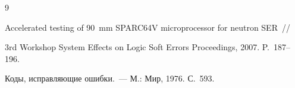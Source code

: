 {{\begin{thebibliography}{9}




Accelerated testing of 90~mm SPARC64V microprocessor for neutron SER~/\!\!/ 


 3rd Workshop System Effects on Logic Soft Errors Proceedings, 2007. P.~187--196.


 


 \label{end\stat}









Коды, исправляющие ошибки.~--- М.: Мир, 1976. С.~593.


 \end{thebibliography}


}


}


